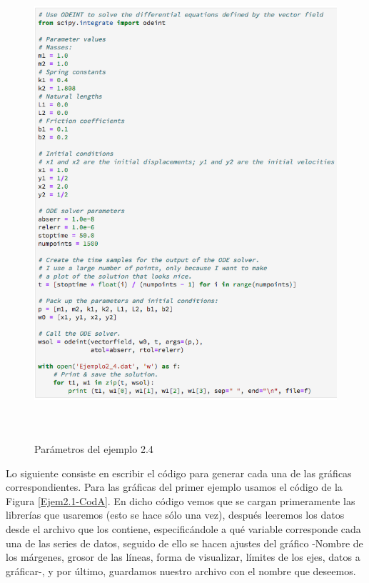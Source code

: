 \begin{figure}
	\begin{center}
        \includegraphics[height=17.5cm]{Ejem2_4-Para}
        \caption{Parámetros del ejemplo 2.4}
        \label{Ejem2.4-Para}
    \end{center}
\end{figure}

Lo siguiente consiste en escribir el código para generar cada una de las gráficas correspondientes. Para las gráficas del primer ejemplo usamos el código de la Figura \ref{Ejem2.1-CodA}. En dicho código vemos que se cargan primeramente las librerías que usaremos (esto se hace sólo una vez), después leeremos los datos desde el archivo que los contiene, especificándole a qué variable corresponde cada una de las series de datos, seguido de ello se hacen ajustes del gráfico -Nombre de los márgenes, grosor de las líneas, forma de visualizar, límites de los ejes, datos a gráficar-, y por último, guardamos nuestro archivo con el nombre que deseemos.

